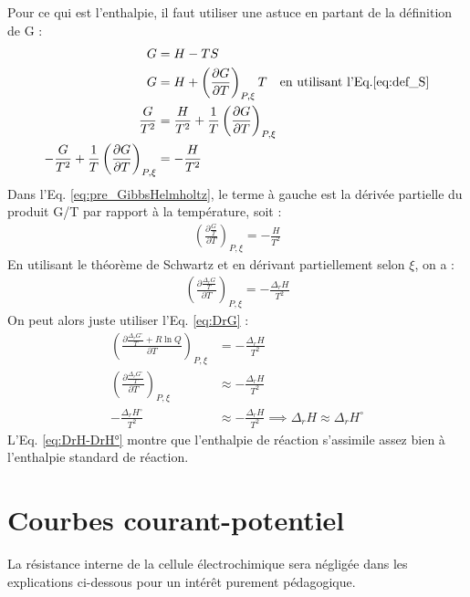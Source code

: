 \documentclass[twoside,a4paper,11pt,addpoints]{exam}%
\begin{document}
Pour ce qui est l'enthalpie, il faut utiliser une astuce en partant de la définition de G : 
\begin{align}
G &= H - T S \\
G &= H + \left( \frac{\partial G}{\partial T} \right)_{P, \xi} T \quad \text{en utilisant l'Eq.}\ref{eq:def_S} \\
\frac{G}{T^2} &= \frac{H}{T^2} + \frac{1}{T} \left( \frac{\partial G}{\partial T} \right)_{P, \xi} \\
- \frac{G}{T^2} + \frac{1}{T} \left( \frac{\partial G}{\partial T} \right)_{P, \xi} &= - \frac{H}{T^2} \label{eq:pre_GibbsHelmholtz}
\end{align}
Dans l'Eq. \ref{eq:pre_GibbsHelmholtz}, le terme à gauche est la dérivée partielle du produit G/T par rapport à la température, soit : 
\begin{align}
\left( \frac{\partial \frac{G}{T}}{\partial T} \right)_{P, \xi} = - \frac{H}{T^2}
\end{align}
En utilisant le théorème de Schwartz et en dérivant partiellement selon $\xi$, on a : 
\begin{align}
\left( \frac{\partial \frac{\Delta_r G}{T}}{\partial T} \right)_{P, \xi} = - \frac{\Delta_r H}{T^2}
\end{align}
On peut alors juste utiliser l'Eq. \ref{eq:DrG} :
\begin{align}
\left( \frac{\partial \frac{\Delta_r G^\circ}{T} + R \ln Q}{\partial T} \right)_{P, \xi} &= - \frac{\Delta_r H}{T^2} \\
\left( \frac{\partial \frac{\Delta_r G^\circ}{T}}{\partial T} \right)_{P, \xi} &\approx - \frac{\Delta_r H}{T^2} \\
- \frac{\Delta_r H^\circ}{T^2} &\approx - \frac{\Delta_r H}{T^2} \implies  \Delta_r H \approx \Delta_r H^\circ \label{eq:DrH-DrH°}
\end{align}
L'Eq. \ref{eq:DrH-DrH°} montre que l'enthalpie de réaction s'assimile assez bien à l'enthalpie standard de réaction.

\section{Courbes courant-potentiel}
\label{sec:I-E}

{\tiny La résistance interne de la cellule électrochimique sera négligée dans les explications ci-dessous pour un intérêt purement pédagogique.}%
\end{document}
